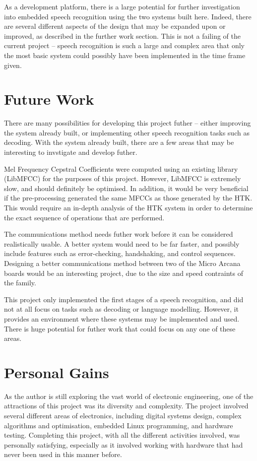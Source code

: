 	As a development platform, there is a large potential for further investigation into embedded speech recognition using the two systems built here.  Indeed, there are several different aspects of the design that may be expanded upon or improved, as described in the further work section.  This is not a failing of the current project -- speech recognition is such a large and complex area that only the most basic system could possibly have been implemented in the time frame given.


\section{Future Work} %
\label{sec:future_work}
	There are many possibilities for developing this project futher -- either improving the system already built, or implementing other speech recognition tasks such as decoding.  With the system already built, there are a few areas that may be interesting to invstigate and develop futher.

	Mel Frequency Cepstral Coefficients were computed using an existing library (LibMFCC) for the purposes of this project.  However, LibMFCC is extremely slow, and should definitely be optimised.  In addition, it would be very beneficial if the pre-processing generated the same MFCCs as those generated by the HTK.  This would require an in-depth analysis of the HTK system in order to determine the exact sequence of operations that are performed.

	The communications method needs futher work before it can be considered realistically usable.  A better system would need to be far faster, and possibly include features such as error-checking, handshaking, and control sequences.  Designing a better communications method between two of the Micro Arcana boards would be an interesting project, due to the size and speed contraints of the family.

	This project only implemented the first stages of a speech recognition, and did not at all focus on tasks such as decoding or language modelling.  However, it provides an environment where these systems may be implemented and used.  There is huge potential for futher work that could focus on any one of these areas.


\section{Personal Gains} %
\label{sec:personal_gains}
	As the author is still exploring the vast world of electronic engineering, one of the attractions of this project was its diversity and complexity.  The project involved several different areas of electronics, including digital systems design, complex algorithms and optimisation, embedded Linux programming, and hardware testing.  Completing this project, with all the different activities involved, was personally satisfying, especially as it involved working with hardware that had never been used in this manner before.

